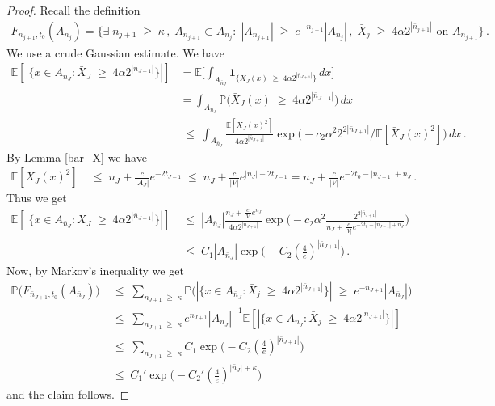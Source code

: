 \documentclass[11pt]{article}
\numberwithin{equation}{section}
\theoremstyle{definition}
\renewcommand{\leq}{\;\leqslant\;}                   %
\renewcommand{\geq}{\;\geqslant\;}                   %
\newcommand{\E}{\mathbb{E}}
\renewcommand{\P}{\mathbb{P}}
\newcommand{\ab}{|}
\newcommand{\Pb}{\P}
\begin{document}
\begin{proof} Recall the definition
\begin{align*}
F_{\bar n_{j+1}, t_0}(A_{\bar n_j}) = \{ \exists \; n_{j+1} \geq \kappa\,,   \;  A_{\bar n_{j+1}} \subset A_{\bar n_j}: \; |A_{\bar n_{j+1}}| \geq e^{-n_{j+1}} \ab A_{\bar n_j} \ab \,, \; \bar X_{j} \geq 4 \alpha 2^{|\bar n_{j+1}|} \text{ on } A_{\bar n_{j+1}}\}\,.
\end{align*}
We use a crude Gaussian estimate. We have
\begin{align*}
\E[ | \{ x  \in A_{\bar n_J} : \bar X_{J} \geq  4 \alpha 2^{| \bar n_{J+1}|} \}| ] & = \E \big[ \int_{A_{\bar n_J}} \mathbf{1}_{\{ \bar X_{J}(x) \geq  4 \alpha 2^{| \bar n_{J+1}|} \}} \, dx \big] \\
&= \int_{A_{\bar n_J}} \Pb \big( \bar X_{J}(x) \geq  4 \alpha 2^{| \bar n_{J+1}|} \big) \, dx   \\
& \leq  \int_{A_{\bar n_J}}  \frac{\E[ \bar X_J(x)^2]}{4 \alpha 2^{\ab \bar n_{J+1}\ab }} \exp \big( - c_2 \alpha^2 2^{2 | \bar n_{J+1}|}/ \E [ \bar X_{J}(x)^2] \big) \, dx  \,.
\end{align*}
By Lemma \ref{bar_X} we have
\begin{align*}
\E [\bar X_{J}(x)^2] &\leq n_J + \tfrac{c}{\ab A_J\ab} e^{-2 t_{J-1}} \leq n_J + \tfrac{c}{\ab V \ab} e^{ \ab \bar n_J \ab-2t_{J-1}}    = n_J + \tfrac{c}{\ab V \ab} e^{-2t_0 - \ab \bar n_{J-1} \ab + n_J}\,.
\end{align*}
Thus we get
\begin{align*}
\E[ | \{ x  \in A_{\bar n_J} : \bar X_{J} \geq  4 \alpha 2^{| \bar n_{J+1}|} \}| ] & \leq |A_{\bar n_J}| \frac{n_J + \frac{c}{|V|} e^{n_J}}{4 \alpha 2^{|\bar n_{J+1}|}} \exp \Big( - c_2 \alpha^2  \frac{2^{2 | \bar n_{J+1}|}}{n_J + \tfrac{c}{\ab V \ab} e^{-2t_0 - \ab \bar n_{J-1} \ab + n_J}}  \Big) \\
& \leq C_1 |A_{\bar n_J}| \exp \big( - C_2 (\tfrac{4}{e})^{|\bar n_{J+1}|} \big)\,.
\end{align*}
Now, by Markov's inequality we get 
\begin{align*}
\Pb \big( F_{\bar n_{J+1}, t_0}(A_{\bar n_J}) \big) & \leq \sum_{n_{J+1} \geq \kappa} \Pb \big( | \{  x \in A_{\bar n_J} : \bar X_j \geq 4 \alpha 2^{|\bar n_{J+1}|} \} | \geq e^{-n_{J+1}} |A_{\bar n_J}| \big) \\
& \leq \sum_{n_{J+1} \geq \kappa} e^{n_{J+1}} |A_{\bar n_J}|^{-1} \E [ | \{  x \in A_{\bar n_J} : \bar X_j \geq 4 \alpha 2^{|\bar n_{J+1}|} \} | ]  \\
& \leq  \sum_{n_{J+1} \geq \kappa} C_1  \exp \big( - C_2 (\tfrac{4}{e})^{|\bar n_{J+1}|} \big) \\
& \leq C_1' \exp \big( -C_2'  (\tfrac{4}{e})^{|\bar n_{J}| + \kappa} \big)
\end{align*}
and the claim follows.
\end{proof}
\end{document}
